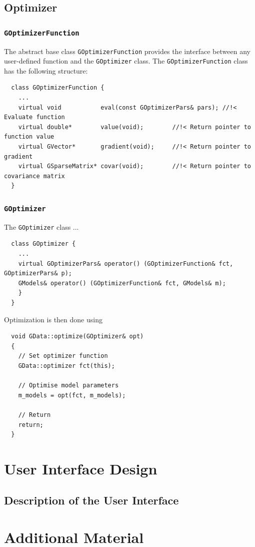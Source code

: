 \documentclass{article}[12pt,a4]
\begin{document}
\subsection{Optimizer}

\subsubsection{{\tt GOptimizerFunction}}

The abstract base class {\tt GOptimizerFunction} provides the interface between any
user-defined function and the {\tt GOptimizer} class.
The {\tt GOptimizerFunction} class has the following structure:
\begin{verbatim}
  class GOptimizerFunction {
    ...
    virtual void           eval(const GOptimizerPars& pars); //!< Evaluate function
    virtual double*        value(void);        //!< Return pointer to function value
    virtual GVector*       gradient(void);     //!< Return pointer to gradient
    virtual GSparseMatrix* covar(void);        //!< Return pointer to covariance matrix
  }
\end{verbatim}




\subsubsection{{\tt GOptimizer}}

The {\tt GOptimizer} class ...
\begin{verbatim}
  class GOptimizer {
    ...
    virtual GOptimizerPars& operator() (GOptimizerFunction& fct, GOptimizerPars& p);
    GModels& operator() (GOptimizerFunction& fct, GModels& m);
    }
  }
\end{verbatim}

Optimization is then done using

\begin{verbatim}
  void GData::optimize(GOptimizer& opt)
  {
    // Set optimizer function
    GData::optimizer fct(this);

    // Optimise model parameters
    m_models = opt(fct, m_models);

    // Return
    return;
  }
\end{verbatim}



\section{User Interface Design}

\subsection{Description of the User Interface}


\section{Additional Material}
\end{document}

